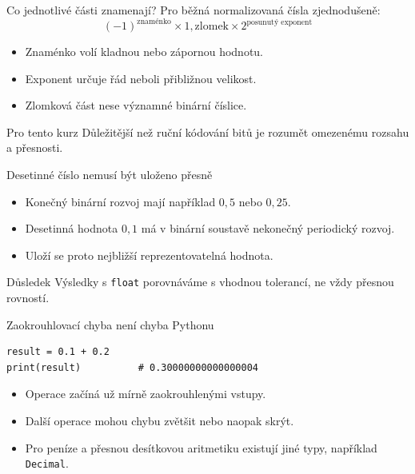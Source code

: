 \documentclass[aspectratio=169]{beamer}
\begin{document}
\begin{frame}{Co jednotlivé části znamenají?}
  Pro běžná normalizovaná čísla zjednodušeně:
  \[
    (-1)^{\text{znaménko}}\times 1{,}\text{zlomek}\times 2^{\text{posunutý exponent}}
  \]
  \begin{itemize}
    \item Znaménko volí kladnou nebo zápornou hodnotu.
    \item Exponent určuje řád neboli přibližnou velikost.
    \item Zlomková část nese významné binární číslice.
  \end{itemize}
  \begin{alertblock}{Pro tento kurz}
    Důležitější než ruční kódování bitů je rozumět omezenému rozsahu a přesnosti.
  \end{alertblock}
\end{frame}

\begin{frame}{Desetinné číslo nemusí být uloženo přesně}
  \begin{itemize}
    \item Konečný binární rozvoj mají například $0{,}5$ nebo $0{,}25$.
    \item Desetinná hodnota $0{,}1$ má v binární soustavě nekonečný periodický rozvoj.
    \item Uloží se proto nejbližší reprezentovatelná hodnota.
  \end{itemize}
  \begin{block}{Důsledek}
    Výsledky s \texttt{float} porovnáváme s vhodnou tolerancí, ne vždy přesnou rovností.
  \end{block}
\end{frame}

\begin{frame}[fragile]{Zaokrouhlovací chyba není chyba Pythonu}
\begin{lstlisting}[style=python]
result = 0.1 + 0.2
print(result)          # 0.30000000000000004
\end{lstlisting}
  \begin{itemize}
    \item Operace začíná už mírně zaokrouhlenými vstupy.
    \item Další operace mohou chybu zvětšit nebo naopak skrýt.
    \item Pro peníze a přesnou desítkovou aritmetiku existují jiné typy, například \texttt{Decimal}.
  \end{itemize}
\end{frame}
\end{document}
